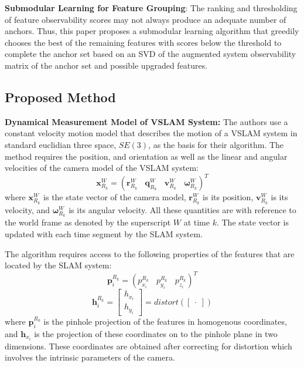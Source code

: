 \documentclass[10pt,twocolumn,letterpaper]{article}
\begin{document}
\textbf{Submodular Learning for Feature Grouping}: The ranking and thresholding of feature 
observability scores may not 
always produce an adequate number of anchors. 
Thus, this paper proposes a submodular learning algorithm that 
greedily chooses the best of the remaining features with scores 
below the threshold to complete the anchor set based on an 
SVD of the augmented system observability matrix of the anchor set and possible upgraded features. 

\subsection{Proposed Method}
\textbf{Dynamical Measurement Model of VSLAM System:}
The authors use a constant velocity motion model that describes the motion of a VSLAM system in standard 
euclidian three space, 
$SE(3)$, as the basis for their algorithm. The method requires the position, and orientation as well as the linear 
and angular velocities 
of the camera model of the VSLAM system: 
\begin{equation} \label{eq:stateVector}
\boldsymbol{x}_{R_k}^W = (\boldsymbol{r}_{R_k}^W \ \ \ \  \boldsymbol{q}_{R_k}^W  \ \ \ \  \boldsymbol{v}_{R_k}^W  \ \ \ \  \boldsymbol{\omega}_{R_k}^W)^T
\end{equation}
where $\boldsymbol{x}_{R_k}^W$ is the state vector of the camera model, 
$\boldsymbol{r}_{R_k}^W$ is its position, 
$\boldsymbol{v}_{R_k}^W$ is its velocity, 
and $\boldsymbol{\omega}_{R_k}^W$ is its angular velocity. All these quantities are with reference to the world frame as denoted by the superscript $W$ at time $k$. 
The state vector is updated with each time segment by the SLAM system. 

The algorithm requires access to the following properties of the features that are located by the SLAM system: 
\begin{equation} \label{eq:featureProjection}
\boldsymbol{p}_{i}^{R_k} = ({p}_{x_i}^{R_k} \ \ \ \  {p}_{y_i}^{R_k}  \ \ \ \  {p}_{z_i}^{R_k})^T
\end{equation}
\begin{equation} \label{eq:featureProjection2}
\boldsymbol{h}_{i}^{R_k} = \begin{bmatrix} {h}_{x_i} \\ {h}_{y_i} \end{bmatrix} = distort(\begin{bmatrix} . \end{bmatrix})
\end{equation}
where $\boldsymbol{p}_{i}^{R_k}$ is the pinhole projection of the features in homogenous coordinates, and 
$\boldsymbol{h}_{x_i}$ is the projection of these coordinates on to the pinhole plane in two dimensions. 
These coordinates are obtained after correcting for distortion which involves the intrinsic parameters of the
 camera.
\end{document}
